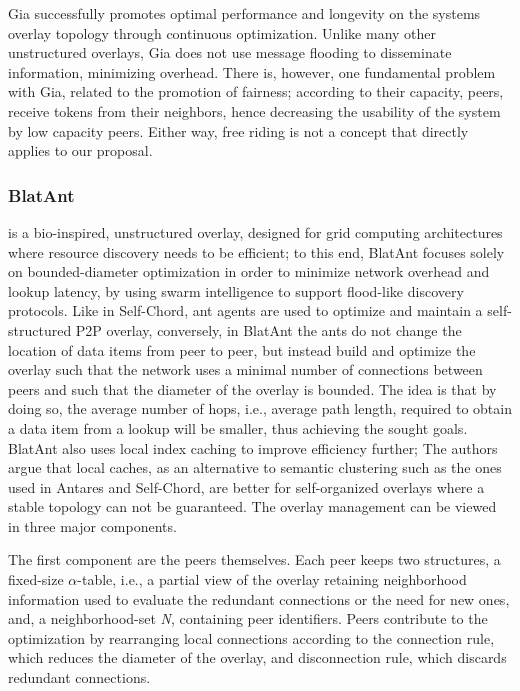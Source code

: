 \documentclass[runningheads]{llncs}
\begin{document}
Gia successfully promotes optimal performance and longevity on the systems overlay topology through continuous optimization. Unlike many other unstructured overlays, Gia does not use message flooding to disseminate information, minimizing overhead. There is, however, one fundamental problem with Gia, related to the promotion of fairness; according to their capacity, peers, receive tokens from their neighbors, hence decreasing the usability of the system by low capacity peers. Either way, free riding is not a concept that directly applies to our proposal.\newline

\subsubsection{BlatAnt} \cite{blatant} is a bio-inspired, unstructured overlay, designed for grid computing architectures where resource discovery needs to be efficient; to this end, BlatAnt focuses solely on bounded-diameter optimization in order to minimize network overhead and lookup latency, by using swarm intelligence to support flood-like discovery protocols. Like in Self-Chord\cite{selfchord}, ant agents are used to optimize and maintain a self-structured P2P overlay, conversely, in BlatAnt the ants do not change the location of data items from peer to peer, but instead build and optimize the overlay such that the network uses a minimal number of connections between peers and such that the diameter of the overlay is bounded. The idea is that by doing so, the average number of hops, i.e., average path length, required to obtain a data item from a lookup will be smaller, thus achieving the sought goals. BlatAnt also uses local index caching to improve efficiency further; The authors argue that local caches,  as an alternative to semantic clustering such as the ones used in Antares\cite{antares} and Self-Chord, are better for self-organized overlays where a stable topology can not be guaranteed. The overlay management can be viewed in three major components.

The first component are the peers themselves. Each peer keeps two structures, a   fixed-size $\alpha$-table, i.e., a partial view of the overlay retaining neighborhood information used to evaluate the redundant connections or the need for new ones, and, a neighborhood-set \textit{N}, containing peer identifiers. Peers contribute to the optimization by rearranging local connections according to the connection rule, which reduces the diameter of the overlay, and disconnection rule, which discards redundant connections.
\end{document}
